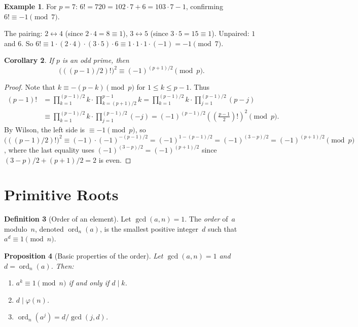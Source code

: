 \documentclass[12pt,a4paper,openany]{book}
\theoremstyle{definition}
\newtheorem{definition}{Definition}[chapter]
\newtheorem{example}[definition]{Example}
\theoremstyle{plain}
\newtheorem{proposition}[definition]{Proposition}
\newtheorem{corollary}[definition]{Corollary}
\theoremstyle{remark}
\DeclareMathOperator{\ord}{ord}
\begin{document}
\begin{example}
\label{ex:wilson}
For $p = 7$: $6! = 720 = 102 \cdot 7 + 6 = 103 \cdot 7 - 1$, confirming
$6! \equiv -1 \pmod{7}$.

The pairing: $2 \leftrightarrow 4$ (since $2 \cdot 4 = 8 \equiv 1$),
$3 \leftrightarrow 5$ (since $3 \cdot 5 = 15 \equiv 1$).  Unpaired: $1$ and $6$.
So $6! \equiv 1 \cdot (2 \cdot 4) \cdot (3 \cdot 5) \cdot 6 \equiv
1 \cdot 1 \cdot 1 \cdot (-1) = -1 \pmod{7}$.
\end{example}

\begin{corollary}
\label{cor:wilson-square}
If $p$ is an odd prime, then
\[
  \bigl(((p-1)/2)!\bigr)^2 \equiv (-1)^{(p+1)/2} \pmod{p}.
\]
\end{corollary}

\begin{proof}
Note that $k \equiv -(p-k) \pmod{p}$ for $1 \le k \le p-1$.  Thus
\begin{align*}
  (p-1)! &= \prod_{k=1}^{(p-1)/2} k \cdot \prod_{k=(p+1)/2}^{p-1} k
           = \prod_{k=1}^{(p-1)/2} k \cdot \prod_{j=1}^{(p-1)/2} (p - j) \\
         &\equiv \prod_{k=1}^{(p-1)/2} k \cdot \prod_{j=1}^{(p-1)/2} (-j)
          = (-1)^{(p-1)/2} \left(\left(\frac{p-1}{2}\right)!\right)^{\!2} \pmod{p}.
\end{align*}
By Wilson, the left side is $\equiv -1 \pmod{p}$, so
$\bigl(((p-1)/2)!\bigr)^2 \equiv (-1) \cdot (-1)^{-(p-1)/2}
= (-1)^{1-(p-1)/2} = (-1)^{(3-p)/2} = (-1)^{(p+1)/2} \pmod{p}$,
where the last equality uses $(-1)^{(3-p)/2} = (-1)^{(p+1)/2}$
since $(3-p)/2 + (p+1)/2 = 2$ is even.
\end{proof}

\section{Primitive Roots}
\label{sec:primitive-roots}

\begin{definition}[Order of an element]
\label{def:order-element}
Let $\gcd(a,n) = 1$.  The \emph{order} of~$a$ modulo~$n$, denoted
$\ord_n(a)$\index{ord@$\ord_n(a)$}, is the smallest positive integer~$d$
such that $a^d \equiv 1 \pmod{n}$.
\end{definition}

\begin{proposition}[Basic properties of the order]
\label{prop:order-props}
Let $\gcd(a,n) = 1$ and $d = \ord_n(a)$.  Then:
\begin{enumerate}[label=(\roman*)]
  \item $a^k \equiv 1 \pmod{n}$ if and only if $d \mid k$.
  \item $d \mid \varphi(n)$.
  \item $\ord_n(a^j) = d / \gcd(j, d)$.
\end{enumerate}
\end{proposition}
\end{document}
